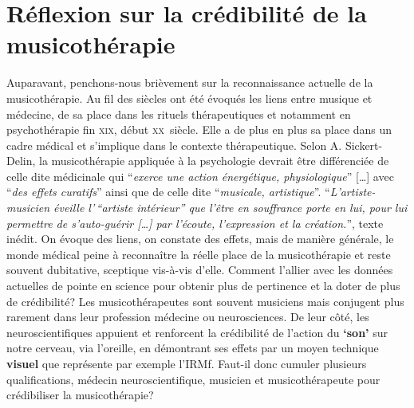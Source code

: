 \section{Réflexion sur la crédibilité de la musicothérapie }

Auparavant, penchons-nous brièvement sur la reconnaissance actuelle de la musicothérapie.
Au fil des siècles ont été évoqués les liens entre musique et médecine, de sa place dans les
rituels thérapeutiques et notamment en psychothérapie fin \textsc{xix}\ieme,
début \textsc{xx}\ieme\ siècle.
Elle a de plus en plus sa place dans un cadre médical et s'implique dans le contexte thérapeutique.
Selon A. Sickert-Delin, la musicothérapie appliquée à la
psychologie devrait être différenciée de celle dite médicinale qui
\enquote{\emph{exerce une action
énergétique, physiologique}} [\dots] avec \enquote{\emph{des effets curatifs}}
ainsi que de celle dite \enquote{\emph{musicale, artistique}}.
\enquote{\emph{L'artiste-musicien éveille l'\,``artiste intérieur'' que l'être
en souffrance porte en lui, pour lui permettre de s'auto-guérir [\dots] par
l'écoute, l'expression et la création.}}\autocite[14] {viret:b},
texte inédit.
On évoque des liens, on constate des effets, mais de manière générale, le monde médical peine à reconnaître la réelle place de la musicothérapie et reste souvent dubitative, sceptique vis-à-vis d'elle.
 Comment l'allier avec les données actuelles de pointe en
science pour obtenir plus de pertinence
et la doter de plus de crédibilité?
Les musicothérapeutes sont souvent musiciens mais conjugent plus
rarement dans leur profession
médecine ou neurosciences. De leur côté, les neuroscientifiques appuient
et renforcent la crédibilité de l'action du \textbf{`son'} sur notre cerveau, via
l'oreille, en démontrant ses effets par un moyen technique
\textbf{visuel} que représente par exemple l'IRMf. 
Faut-il donc cumuler plusieurs qualifications, médecin neuroscientifique,  musicien et musicothérapeute pour crédibiliser la musicothérapie?
